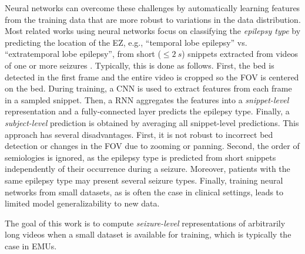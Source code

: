 Neural networks can overcome these challenges by automatically learning features from the training data that are more robust to variations in the data distribution.
Most related works using neural networks focus on classifying the \emph{epilepsy type} by predicting the location of the \ac{EZ}, e.g., ``temporal lobe epilepsy'' vs. ``extratemporal lobe epilepsy'', from short ($\le \SI{2}{s}$) snippets extracted from videos of one or more seizures \cite{ahmedt-aristizabal_deep_2018,ahmedt-aristizabal_hierarchical_2018,ahmedt-aristizabal_deep_2018-1,maia_epileptic_2019,karacsony_deep_2020}.
Typically, this is done as follows.
First, the bed is detected in the first frame and the entire video is cropped so the \ac{FOV} is centered on the bed.
During training, a \ac{CNN} is used to extract features from each frame in a sampled snippet.
Then, a \ac{RNN} aggregates the features into a \emph{snippet-level} representation and a fully-connected layer predicts the epilepsy type.
Finally, a \emph{subject-level} prediction is obtained by averaging all snippet-level predictions.
This approach has several disadvantages.
First, it is not robust to incorrect bed detection or changes in the \ac{FOV} due to zooming or panning.
Second, the order of semiologies is ignored, as the epilepsy type is predicted from short snippets independently of their occurrence during a seizure.
Moreover, patients with the same epilepsy type may present several seizure types.
Finally, training neural networks from small datasets, as is often the case in clinical settings, leads to limited model generalizability to new data.

The goal of this work is to compute \emph{seizure-level} representations of arbitrarily long videos when a small dataset is available for training, which is typically the case in \acp{EMU}.

